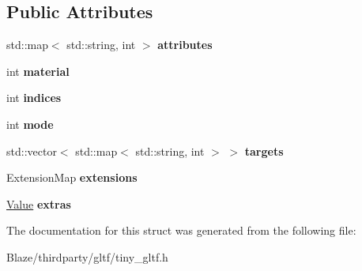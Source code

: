 \subsection*{Public Attributes}
\begin{DoxyCompactItemize}
\item 
\mbox{\label{structtinygltf_1_1Primitive_a99f22177cfa3512d5c1ff9399bafa4c0}} 
std\+::map$<$ std\+::string, int $>$ {\bfseries attributes}
\item 
\mbox{\label{structtinygltf_1_1Primitive_a54066fa25de484c5002719e28d9f8c88}} 
int {\bfseries material}
\item 
\mbox{\label{structtinygltf_1_1Primitive_ada9c73cdc9e050630cc80c6a8c174456}} 
int {\bfseries indices}
\item 
\mbox{\label{structtinygltf_1_1Primitive_a67fce6f08d2c8a8f1efbcceb81a4b2d9}} 
int {\bfseries mode}
\item 
\mbox{\label{structtinygltf_1_1Primitive_af51df71bd2d8a271fc99ec30027ad228}} 
std\+::vector$<$ std\+::map$<$ std\+::string, int $>$ $>$ {\bfseries targets}
\item 
\mbox{\label{structtinygltf_1_1Primitive_ac0ac943cc1087f68fdefa2fd4a243bd3}} 
Extension\+Map {\bfseries extensions}
\item 
\mbox{\label{structtinygltf_1_1Primitive_ad31fb33856575d68e27131b0f335f959}} 
\hyperlink{classtinygltf_1_1Value}{Value} {\bfseries extras}
\end{DoxyCompactItemize}


The documentation for this struct was generated from the following file\+:\begin{DoxyCompactItemize}
\item 
Blaze/thirdparty/gltf/tiny\+\_\+gltf.\+h\end{DoxyCompactItemize}
